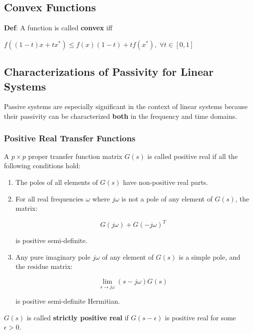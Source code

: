 \subsection{Convex Functions}
\textbf{Def}: A function is called \textbf{convex} iff

$f((1-t)x + tx^\ast) \leq f(x)(1-t) + t f(x^\ast), \; \forall t \in [0,1]$

\subsection{Characterizations of Passivity for Linear Systems}\label{passivity_linear_sys}

Passive systems are especially significant in the context of linear systems because their passivity can be characterized \textbf{both} in the frequency and time domains.

\subsubsection{Positive Real Transfer Functions}

A $p \times p$ proper transfer function matrix $G(s)$ is called positive real if all the following conditions hold:

\begin{enumerate}
    \item The poles of all elements of $G(s)$ have non-positive real parts.
    \item For all real frequencies $\omega$ where $j\omega$ is not a pole of any element of $G(s)$, the matrix:

          \begin{equation*}
              G(j\omega) + G(-j\omega)^T
          \end{equation*}

          is positive semi-definite.

    \item Any pure imaginary pole $j\omega$ of any element of $G(s)$ is a simple pole, and the residue matrix:

          \begin{equation*}
              \lim_{s \to j\omega} (s - j\omega) G(s)
          \end{equation*}

          is positive semi-definite Hermitian.
\end{enumerate}
\newpar{}
$G(s)$ is called \textbf{strictly positive real} if $G(s - \epsilon)$ is positive real for some $\epsilon > 0$.

